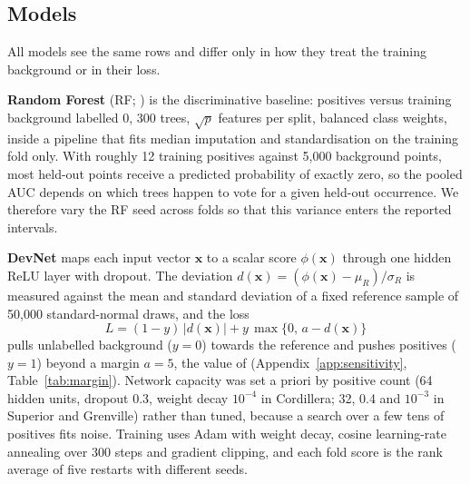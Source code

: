 \documentclass[pdflatex,sn-apa]{sn-jnl}
\begin{document}
\subsection{Models}\label{sec:models}

All models see the same rows and differ only in how they treat the training background or in their loss.

\textbf{Random Forest} (RF; \citealp{Breiman2001}) is the discriminative baseline: positives versus training background labelled 0, 300 trees, $\sqrt{p}$ features per split, balanced class weights, inside a pipeline that fits median imputation and standardisation on the training fold only. With roughly 12 training positives against 5,000 background points, most held-out points receive a predicted probability of exactly zero, so the pooled AUC depends on which trees happen to vote for a given held-out occurrence. We therefore vary the RF seed across folds so that this variance enters the reported intervals.

\textbf{DevNet} \citep{Pang2019} maps each input vector $\mathbf{x}$ to a scalar score $\phi(\mathbf{x})$ through one hidden ReLU layer with dropout. The deviation $d(\mathbf{x}) = (\phi(\mathbf{x}) - \mu_R)/\sigma_R$ is measured against the mean and standard deviation of a fixed reference sample of 50,000 standard-normal draws, and the loss
\begin{equation}
L = (1-y)\,|d(\mathbf{x})| + y\,\max\{0,\, a - d(\mathbf{x})\}
\end{equation}
pulls unlabelled background ($y=0$) towards the reference and pushes positives ($y=1$) beyond a margin $a = 5$, the value of \citet{Pang2019} (Appendix~\ref{app:sensitivity}, Table~\ref{tab:margin}). Network capacity was set a priori by positive count (64 hidden units, dropout 0.3, weight decay $10^{-4}$ in Cordillera; 32, 0.4 and $10^{-3}$ in Superior and Grenville) rather than tuned, because a search over a few tens of positives fits noise. Training uses Adam \citep{Kingma2014} with weight decay, cosine learning-rate annealing over 300 steps and gradient clipping, and each fold score is the rank average of five restarts with different seeds.
\end{document}
